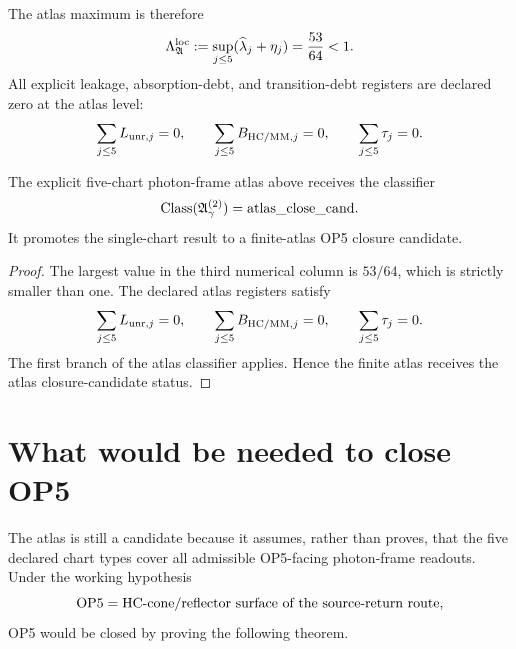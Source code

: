 The atlas maximum is therefore
\[
\Lambda_{\mathfrak A}^{\mathrm{loc}}
:=
\sup_{j\le 5}(\widehat\lambda_j+\eta_j)
=
\frac{53}{64}<1.
\]
All explicit leakage, absorption-debt, and transition-debt registers are declared zero at the atlas level:
\[
\sum_{j\le 5}L_{\mathrm{unr},j}=0,
\qquad
\sum_{j\le 5}B_{\mathrm{HC}/\mathrm{MM},j}=0,
\qquad
\sum_{j\le 5}\tau_j=0.
\]

\begin{proposition}
The explicit five-chart photon-frame atlas above receives the classifier
\[
\mathrm{Class}(\mathfrak A_{\gamma}^{(2)})=
\mathrm{atlas\_close\_cand}.
\]
It promotes the single-chart result to a finite-atlas OP5 closure candidate.
\end{proposition}

\begin{proof}
The largest value in the third numerical column is \(53/64\), which is strictly smaller than one. The declared atlas registers satisfy
\[
\sum_{j\le5}L_{\mathrm{unr},j}=0,
\qquad
\sum_{j\le5}B_{\mathrm{HC}/\mathrm{MM},j}=0,
\qquad
\sum_{j\le5}\tau_j=0.
\]
The first branch of the atlas classifier applies. Hence the finite atlas receives the atlas closure-candidate status.
\end{proof}

\section{What would be needed to close OP5}

The atlas is still a candidate because it assumes, rather than proves, that the five declared chart types cover all admissible OP5-facing photon-frame readouts. Under the working hypothesis
\[
\mathrm{OP}5 = \mathrm{HC}\text{-cone/reflector surface of the source-return route},
\]
OP5 would be closed by proving the following theorem.

